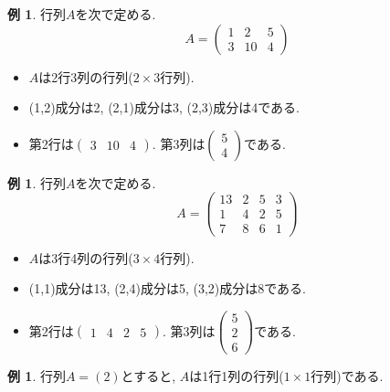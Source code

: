 \documentclass[dvipdfmx,a4paper,11pt]{article}
\theoremstyle{definition}
\newtheorem{exa}[thm]{例}
\begin{document}
 \begin{exa}
 行列$A$を次で定める.
 $$
 A = 
 \begin{pmatrix}
 1 &2&5 \\
 3&10&4
 \end{pmatrix}
 $$
 \begin{itemize}
 \item $A$は2行3列の行列($2 \times 3$行列).
 \item (1,2)成分は2, (2,1)成分は3, (2,3)成分は4である.
 \item 第2行は$\begin{pmatrix}3 & 10 & 4\end{pmatrix}$. 第3列は$\begin{pmatrix}5 \\ 4\end{pmatrix}$である.
 \end{itemize}
 \end{exa}
  \begin{exa}
 行列$A$を次で定める.
 $$
 A = 
 \begin{pmatrix}
 13 &2&5&3 \\
 1 &4&2&5 \\
  7&8&6&1 
 \end{pmatrix}
 $$
 \begin{itemize}
 \item $A$は3行4列の行列($3 \times 4$行列).
 \item (1,1)成分は13, (2,4)成分は5, (3,2)成分は8である.
 \item 第2行は$\begin{pmatrix}1&4&2&5\end{pmatrix}$. 第3列は$\begin{pmatrix}5 \\2\\ 6\end{pmatrix}$である.
 \end{itemize}
 \end{exa}
 
 \begin{exa}行列$A = (2)$とすると, $A$は1行1列の行列($1 \times 1$行列)である.\end{exa}
  
\end{document}
